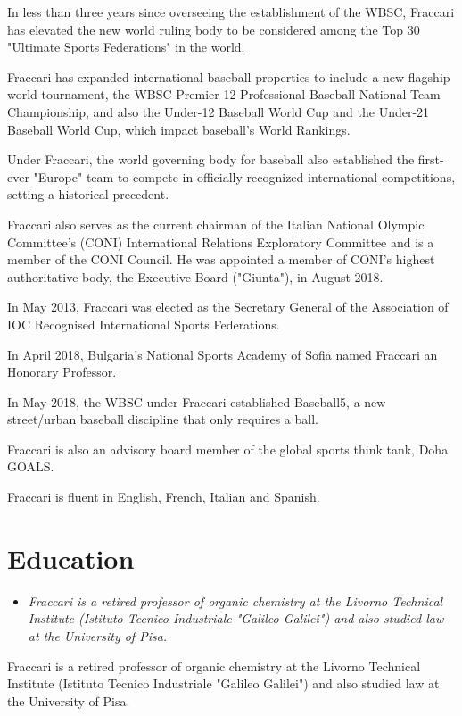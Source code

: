 In less than three years since overseeing the establishment of the WBSC,
Fraccari has elevated the new world ruling body to be considered among
the Top 30 "Ultimate Sports Federations" in the world.

Fraccari has expanded international baseball properties to include a new
flagship world tournament, the WBSC Premier 12 Professional Baseball
National Team Championship, and also the Under-12 Baseball World Cup and
the Under-21 Baseball World Cup, which impact baseball's World Rankings.

Under Fraccari, the world governing body for baseball also established
the first-ever "Europe" team to compete in officially recognized
international competitions, setting a historical precedent.

Fraccari also serves as the current chairman of the Italian National
Olympic Committee's (CONI) International Relations Exploratory Committee
and is a member of the CONI Council. He was appointed a member of CONI's
highest authoritative body, the Executive Board ("Giunta"), in August
2018.

In May 2013, Fraccari was elected as the Secretary General of the
Association of IOC Recognised International Sports Federations.

In April 2018, Bulgaria's National Sports Academy of Sofia named
Fraccari an Honorary Professor.

In May 2018, the WBSC under Fraccari established Baseball5, a new
street/urban baseball discipline that only requires a ball.

Fraccari is also an advisory board member of the global sports think
tank, Doha GOALS.

Fraccari is fluent in English, French, Italian and Spanish.

\section{Education}\label{education}

\begin{itemize}
\item
  \emph{Fraccari is a retired professor of organic chemistry at the
  Livorno Technical Institute (Istituto Tecnico Industriale "Galileo
  Galilei") and also studied law at the University of Pisa.}
\end{itemize}

Fraccari is a retired professor of organic chemistry at the Livorno
Technical Institute (Istituto Tecnico Industriale "Galileo Galilei") and
also studied law at the University of Pisa.

